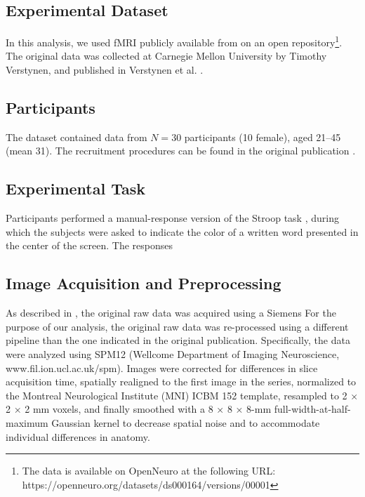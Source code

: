 \documentclass[10pt,letterpaper]{article}
\begin{document}
\subsection{Experimental Dataset}

In this analysis, we used fMRI publicly available from on an open repository\footnote{The data is available on OpenNeuro at the following URL:  https://openneuro.org/datasets/ds000164/versions/00001}. The original data was collected at Carnegie Mellon University by Timothy Verstynen, and published in Verstynen et al. \cite{Verstynen2014}.

\subsection{Participants}

The dataset contained data from $N=30$ participants (10 female), aged 21--45 (mean 31). The recruitment  procedures can be found in the original publication \cite{Verstynen2014}.

\subsection{Experimental Task}

Participants performed a manual-response version of the Stroop task \cite{Stroop1935}, during which the subjects were asked to indicate the color of a written word presented in the center of the screen. The responses 

\subsection{Image Acquisition and Preprocessing}

As described in , the original raw data was acquired using a Siemens 
For the purpose of our analysis, the original raw data was re-processed using a different pipeline than the one indicated in the original publication. Specifically, the data were analyzed using SPM12 (Wellcome Department of Imaging Neuroscience, www.fil.ion.ucl.ac.uk/spm). Images were corrected for differences in slice acquisition time, spatially realigned to the first image in the series, normalized to the Montreal Neurological Institute (MNI) ICBM 152 template, resampled to 2 × 2 × 2 mm voxels, and finally smoothed with a 8 × 8 × 8-mm full-width-at-half-maximum Gaussian kernel to decrease spatial noise and to accommodate individual differences in anatomy. %
\end{document}
